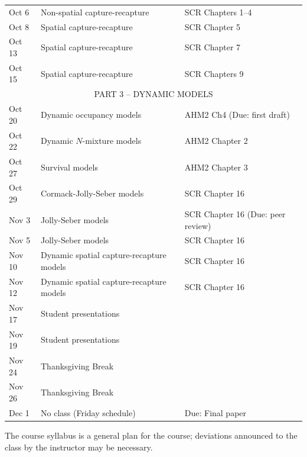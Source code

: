 \documentclass[12pt]{article}
\begin{document}
\begin{center}
\begin{tabular}[c]{lll}
\hline
Oct 6      & Non-spatial capture-recapture            & SCR Chapters 1--4                 \\
Oct 8      & Spatial capture-recapture                & SCR Chapter 5                     \\
\hline
Oct 13     & Spatial capture-recapture                & SCR Chapter 7                     \\
Oct 15     & Spatial capture-recapture                & SCR Chapters 9                    \\
\hline
           \multicolumn{3}{c}{PART 3 -- DYNAMIC MODELS}                                   \\
\hline
Oct 20     & Dynamic occupancy models                 & AHM2 Ch4 (Due: first draft)       \\
Oct 22     & Dynamic $N$-mixture models               & AHM2 Chapter 2                    \\
\hline
Oct 27     & Survival models                          & AHM2 Chapter 3                    \\
Oct 29     & Cormack-Jolly-Seber models               & SCR Chapter 16                    \\
\hline
Nov 3      & Jolly-Seber models                       & SCR Chapter 16 (Due: peer review) \\
Nov 5      & Jolly-Seber models                       & SCR Chapter 16                    \\
\hline
Nov 10     & Dynamic spatial capture-recapture models & SCR Chapter 16                    \\
Nov 12     & Dynamic spatial capture-recapture models & SCR Chapter 16                    \\
\hline
Nov 17     & Student presentations                    &                                   \\
Nov 19     & Student presentations                    &                                   \\
\hline
Nov 24     & Thanksgiving Break                       &                                   \\
Nov 26     & Thanksgiving Break                       &                                   \\
\hline
Dec 1      & No class (Friday schedule)               & Due: Final paper                  \\
\hline \hline
\end{tabular}
\end{center}

The course syllabus is a general plan for the course; deviations announced to the class by the instructor may be necessary.
\end{document}
